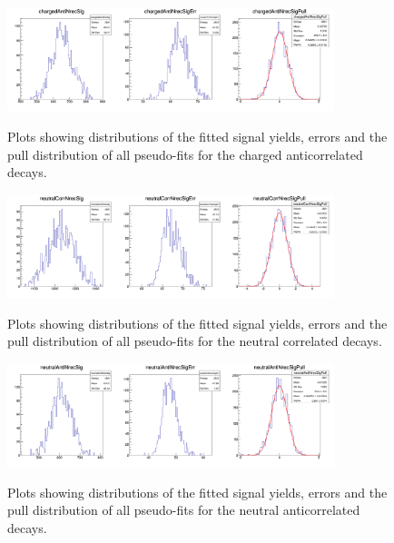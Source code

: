     \begin{figure}[H]
        \centering
        {\includegraphics[width=0.85\textwidth]{04-SimultaneousFit/figs/chargedAntiNrecSigPull.png}}
        \caption{Plots showing distributions of the fitted signal yields, errors and the pull
        distribution of all pseudo-fits for the charged anticorrelated decays.}
        \label{fig:2DchargedAntiNrecSigToys}
        \end{figure}

\begin{figure}[H]
\centering
{\includegraphics[width=0.85\textwidth]{04-SimultaneousFit/figs/neutralCorrNrecSigPull.png}}
\caption{Plots showing distributions of the fitted signal yields, errors and the pull
distribution of all pseudo-fits for the neutral correlated decays.}
\label{fig:2DneutralCorrNrecSigToys}
\end{figure}


\begin{figure}[H]
    \centering
    {\includegraphics[width=0.85\textwidth]{04-SimultaneousFit/figs/neutralAntiNrecSigPull.png}}
    \caption{Plots showing distributions of the fitted signal yields, errors and the pull
    distribution of all pseudo-fits for the neutral anticorrelated decays.}
    \label{fig:2DneutralAntiNrecSigToys}
    \end{figure}